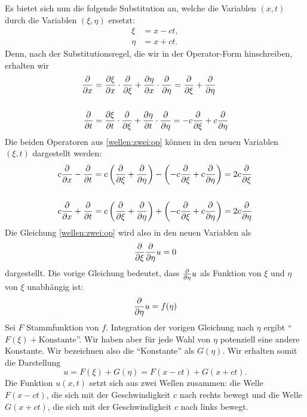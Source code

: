\begin{bem}
	Es bietet sich nun die folgende Substitution an, welche die Variablen $(x,t)$ durch die Variablen $(\xi,\eta)$ ersetzt: 
	\begin{align*}
		\xi & = x -c t, 
	\\	\eta & = x + c t.
	\end{align*} 
	Denn, nach der Substitutionsregel, die wir in der Operator-Form hinschreiben, erhalten wir 
	\begin{align*}
		\frac{\partial }{\partial x}  & = \frac{\partial \xi}{\partial x} \cdot \frac{\partial }{\partial \xi} + \frac{\partial \eta}{\partial x} \cdot \frac{\partial }{\partial \eta} = \frac{\partial }{\partial \xi} + \frac{\partial }{\partial \eta} 
		\\ 
		\\ \frac{\partial }{\partial t}  & = \frac{\partial \xi}{\partial t} \cdot \frac{\partial }{\partial \xi} + \frac{\partial \eta}{\partial t} \cdot \frac{\partial }{\partial \eta} = - c \frac{\partial }{\partial \xi} + c \frac{\partial }{\partial \eta}
	\end{align*}
	Die beiden Operatoren aus \eqref{wellen:zwei:op} können in den neuen Variablen $(\xi,t)$ dargestellt werden: 
	\begin{align*}
		c \frac{\partial }{\partial x} - \frac{\partial }{\partial t} &  = c \left( \frac{\partial }{\partial \xi} + \frac{\partial }{\partial \eta} \right)  - \left( - c \frac{\partial }{\partial \xi} + c \frac{\partial }{\partial \eta} \right)  = 2 c \frac{\partial }{\partial \xi}
		\\
		\\ c \frac{\partial }{\partial x} + \frac{\partial }{\partial t} &  = c \left( \frac{\partial }{\partial \xi} + \frac{\partial }{\partial \eta} \right)  + \left( - c \frac{\partial }{\partial \xi} + c \frac{\partial }{\partial \eta} \right)  = 2 c \frac{\partial }{\partial \eta}
	\end{align*} 
	Die Gleichung \eqref{wellen:zwei:op} wird also in den neuen Variablen als 
	\[
		\frac{\partial }{\partial \xi} \frac{\partial }{\partial \eta} u = 0 
	\]
	dargestellt. Die vorige Gleichung bedeutet, dass $\frac{\partial }{\partial \eta} u$ als Funktion von $\xi$ und $\eta$ von $\xi$ unabhängig ist: 
	\[
		\frac{\partial }{\partial \eta} u = f(\eta) 
	\]
	Sei $F$ Stammfunktion von $f$. Integration der vorigen Gleichung nach $\eta$ ergibt ``$F(\xi)  + \text{Konstante}$''. Wir haben aber für jede Wahl von $\eta$ potenziell eine andere Konstante. Wir bezeichnen also die ``Konstante'' als $G(\eta)$. Wir erhalten somit die Darstellung 
	\[
		u  = F(\xi) + G(\eta) = F(x - c t) + G(x+ ct). 
	\]
	Die Funktion $u(x,t)$ setzt sich aus zwei Wellen zusammen: die Welle $F(x-ct)$, die sich mit der Geschwindigkeit $c$ nach rechts bewegt und die Welle $G(x+ct)$, die sich mit der Geschwindigkeit $c$ nach links bewegt. 
\end{bem} 

